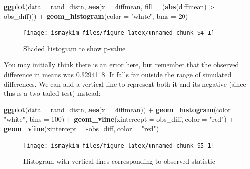 \documentclass[]{tufte-book}
\newenvironment{Shaded}{\begin{snugshade}}{\end{snugshade}}
\newcommand{\KeywordTok}[1]{\textcolor[rgb]{0.13,0.29,0.53}{\textbf{{#1}}}}
\newcommand{\DataTypeTok}[1]{\textcolor[rgb]{0.13,0.29,0.53}{{#1}}}
\newcommand{\DecValTok}[1]{\textcolor[rgb]{0.00,0.00,0.81}{{#1}}}
\newcommand{\StringTok}[1]{\textcolor[rgb]{0.31,0.60,0.02}{{#1}}}
\newcommand{\NormalTok}[1]{{#1}}
\begin{document}
\begin{Shaded}
\begin{Highlighting}[]
\KeywordTok{ggplot}\NormalTok{(}\DataTypeTok{data =} \NormalTok{rand_distn, }\KeywordTok{aes}\NormalTok{(}\DataTypeTok{x =} \NormalTok{diffmean, }\DataTypeTok{fill =} \NormalTok{(}\KeywordTok{abs}\NormalTok{(diffmean) >=}\StringTok{ }\NormalTok{obs_diff))) +}
\StringTok{  }\KeywordTok{geom_histogram}\NormalTok{(}\DataTypeTok{color =} \StringTok{"white"}\NormalTok{, }\DataTypeTok{bins =} \DecValTok{20}\NormalTok{)}
\end{Highlighting}
\end{Shaded}

\begin{figure}

{\centering \texttt{[image: ismaykim\_files/figure-latex/unnamed-chunk-94-1]} 

}

\caption[Shaded histogram to show p-value]{Shaded histogram to show p-value}\label{fig:unnamed-chunk-94}
\end{figure}

You may initially think there is an error here, but remember that the
observed difference in means was 0.8294118. It falls far outside the
range of simulated differences. We can add a vertical line to represent
both it and its negative (since this is a two-tailed test) instead:

\begin{Shaded}
\begin{Highlighting}[]
\KeywordTok{ggplot}\NormalTok{(}\DataTypeTok{data =} \NormalTok{rand_distn, }\KeywordTok{aes}\NormalTok{(}\DataTypeTok{x =} \NormalTok{diffmean)) +}
\StringTok{  }\KeywordTok{geom_histogram}\NormalTok{(}\DataTypeTok{color =} \StringTok{"white"}\NormalTok{, }\DataTypeTok{bins =} \DecValTok{100}\NormalTok{) +}
\StringTok{  }\KeywordTok{geom_vline}\NormalTok{(}\DataTypeTok{xintercept =} \NormalTok{obs_diff, }\DataTypeTok{color =} \StringTok{"red"}\NormalTok{) +}
\StringTok{  }\KeywordTok{geom_vline}\NormalTok{(}\DataTypeTok{xintercept =} \NormalTok{-obs_diff, }\DataTypeTok{color =} \StringTok{"red"}\NormalTok{)}
\end{Highlighting}
\end{Shaded}

\begin{figure}

{\centering \texttt{[image: ismaykim\_files/figure-latex/unnamed-chunk-95-1]} 

}

\caption[Histogram with vertical lines corresponding to observed statistic]{Histogram with vertical lines corresponding to observed statistic}\label{fig:unnamed-chunk-95}
\end{figure}
\end{document}
